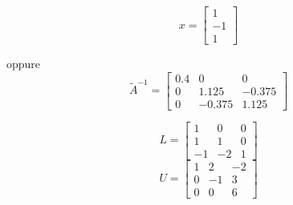 \bigskip
$$x=\left[
\begin{array}{c}
  1 \\
  -1 \\
  1
\end{array}\right]$$

oppure
\bigskip
$$\tilde A^{-1}=\left[
\begin{array}{ccc}
  0.4 & 0 & 0 \\
  0 & 1.125 & -0.375 \\
  0 & -0.375 & 1.125
\end{array}\right]$$


\bigskip
$$ L=\left[
\begin{array}{ccc}
1 & 0 & 0 \\
1 & 1 & 0\\
-1 & -2 & 1
\end{array}
\right]$$
$$ U=\left[
\begin{array}{ccc}
 1& 2 & -2 \\
 0 & -1 & 3 \\
  0 &0 & 6
\end{array}
\right] $$

